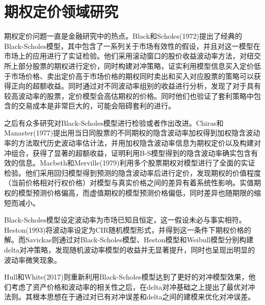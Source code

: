 \section{期权定价领域研究}
\par{
期权定价问题一直是金融研究中的热点。Black和Scholes(1972)提出了经典的Black-Scholes模型\cite{10.2307/1831029}，其中包含了一系列关于市场有效性的假设，并且对这一模型在市场上的应用进行了实证检验\cite{J-1972}。他们采用滚动窗口的股价收益波动率方法，对纽交所上部分股票的期权进行定价，同时构建对冲策略，证实利用模型信息买入定价低于市场价格、卖出定价高于市场价格的期权同时卖出和买入对应股票的策略可以获得正向的超额收益。同时通过对不同波动率组别的收益进行分析，发现了对于具有较高波动率的股票，定价模型会高估期权的价格。同时他们也验证了套利策略中包含的交易成本是非常巨大的，可能会阻碍套利的进行。}
\par{
之后有众多研究对Black-Scholes模型进行检验或者作出改进。Chiras和Manaster(1977)提出用当日同股票的不同期权的隐含波动率加权得到加权隐含波动率的方法取代历史波动率估计法，并用加权隐含波动率信息为期权定价以及构建对冲组合，获得了显著的超额收益，证明利用B-S模型得到的隐含波动率确实包含有效的信息\cite{CHIRAS1978213}。Macbeth和Merville(1979)利用多个股票期权对模型进行了全面的实证检验\cite{Jame-1979}。他们采用回归模型得到预测的隐含波动率后进行定价，发现期权的价值程度（当前价格相对行权价格）对模型与真实价格之间的差异有着系统性影响。实值期权的模型预测价格偏高，而虚值期权的模型预测价格偏低，同时差异也随期限的缩短而减小。
}
\par{Black-Scholes模型设定波动率为市场已知且恒定，这一假设未必与事实相符。Heston(1993)将波动率设定为CIR随机模型形式，并得到这一条件下期权价格的解\cite{10.1093/rfs/6.2.327}。而Savickas则通过对Black-Scholes模型、Heston模型和Weibull模型分别构建delta对冲策略，发现随机波动率模型的收益并无显著提升，同时也呈现出明显的波动率微笑现象\cite{Rober-2005}。}
\par{
    Hull和White(2017)则重新利用Black-Scholes模型达到了更好的对冲模型效果，他们考虑了资产价格和波动率的相关性之后，在delta对冲基础之上提出了最优对冲法则\cite{Hull-2017}。其根本思想在于通过对已有对冲误差和delta之间的建模来优化对冲误差。
}